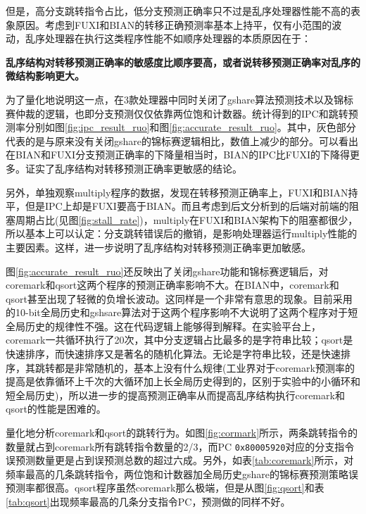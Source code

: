 但是，高分支跳转指令占比，低分支预测正确率只不过是乱序处理器性能不高的表象原因。考虑到FUXI和BIAN的转移正确预测率基本上持平，仅有小范围的波动，乱序处理器在执行这类程序性能不如顺序处理器的本质原因在于：

\textbf{乱序结构对转移预测正确率的敏感度比顺序要高，或者说转移预测正确率对乱序的微结构影响更大。}

为了量化地说明这一点，在3款处理器中同时关闭了gshare算法预测技术以及锦标赛仲裁的逻辑，也即分支预测仅仅依靠两位饱和计数器。统计得到的IPC和跳转预测率分别如图\ref{fig:ipc_result_ruo}和图\ref{fig:accurate_result_ruo}。其中，灰色部分代表的是与原来没有关闭gshare的锦标赛逻辑相比，数值上减少的部分。可以看出在BIAN和FUXI分支预测正确率的下降量相当时，BIAN的IPC比FUXI的下降得更多。证实了乱序结构对转移预测正确率更敏感的结论。

另外，单独观察multiply程序的数据，发现在转移预测正确率上，FUXI和BIAN持平，但是IPC上却是FUXI要高于BIAN。而且考虑到后文分析到的后端对前端的阻塞周期占比(见图\ref{fig:stall_rate})，multiply在FUXI和BIAN架构下的阻塞都很少，所以基本上可以认定：分支跳转错误后的撤销，是影响处理器运行multiply性能的主要因素。这样，进一步说明了乱序结构对转移预测正确率更加敏感。

图\ref{fig:accurate_result_ruo}还反映出了关闭gshare功能和锦标赛逻辑后，对coremark和qsort这两个程序的预测正确率影响不大。在BIAN中，coremark和qsort甚至出现了轻微的负增长波动。这同样是一个非常有意思的现象。目前采用的10-bit全局历史和gshsare算法对于这两个程序影响不大说明了这两个程序对于短全局历史的规律性不强。这在代码逻辑上能够得到解释。在实验平台上，coremark一共循环执行了20次，其中分支逻辑占比最多的是字符串比较；qsort是快速排序，而快速排序又是著名的随机化算法。无论是字符串比较，还是快速排序，其跳转都是非常随机的，基本上没有什么规律(工业界对于coremark预测率的提高是依靠循环上千次的大循环加上长全局历史得到的，区别于实验中的小循环和短全局历史)，所以进一步的提高预测正确率从而提高乱序结构执行coremark和qsort的性能是困难的。

量化地分析coremark和qsort的跳转行为。如图\ref{fig:cormark}所示，两条跳转指令的数量就占到coremark所有跳转指令数量的2/3，而PC \texttt{0x80005920}对应的分支指令误预测数量更是占到误预测总数的超过六成。另外，如表\ref{tab:coremark}所示，对频率最高的几条跳转指令，两位饱和计数器加全局历史gshare的锦标赛预测策略误预测率都很高。qsort程序虽然coremark那么极端，但是从图\ref{fig:qsort}和表\ref{tab:qsort}出现频率最高的几条分支指令PC，预测做的同样不好。

